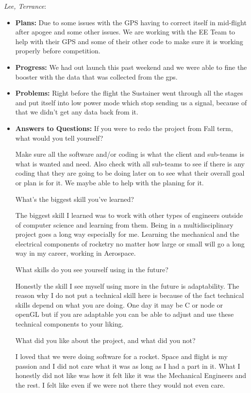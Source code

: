\documentclass[10pt,draftclsnofoot,onecolumn]{IEEEtran}
\newcommand{\subsubsubsection}[1]{
	\hfill\break\textit{#1}:
}
\begin{document}
\subsubsubsection{Lee, Terrance}
\begin{itemize}
	\item \textbf{Plans: }
	Due to some issues with the GPS having to correct itself in mid-flight after apogee and some other issues. We are working with the EE Team to help with their GPS and some of their other code to make sure it is working properly before competition.
	\item \textbf{Progress:  }
	We had out launch this past weekend and we were able to fine the booster with the data that was collected from the gps.
	\item \textbf{Problems: }
	Right before the flight the Sustainer went through all the stages and put itself into low power mode which stop sending us a signal, because of that we didn't get any data back from it.
	\item\textbf{Answers to Questions: }
	If you were to redo the project from Fall term, what would you tell yourself?

	Make sure all the software and/or coding is what the client and sub-teams is what is wanted and need. Also check with all sub-teams to see if there is any coding that they are going to be doing later on to see what their overall goal or plan is for it. We maybe able to help with the planing for it.

	What's the biggest skill you've learned?

	The biggest skill I learned was to work with other types of engineers outside of computer science and learning from them. Being in a multidisciplinary project goes a long way especially for me. Learning the mechanical and the electrical components of rocketry no matter how large or small will go a long way in my career, working in Aerospace.

	What skills do you see yourself using in the future?

	Honestly the skill I see myself using more in the future is adaptability. The reason why I do not put a technical skill here is because of the fact technical skills depend on what you are doing. One day it may be C or node or openGL but if you are adaptable you can be able to adjust and use these technical components to your liking.

	What did you like about the project, and what did you not?

	I loved that we were doing software for a rocket. Space and flight is my passion and I did not care what it was as long as I had a part in it. What I honestly did not like was how it felt like it was the Mechanical Engineers and the rest. I felt like even if we were not there they would not even care.


\end{itemize}
\end{document}
